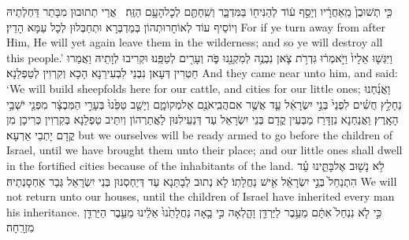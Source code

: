 {כִּ֤י תְשׁוּבֻן֙ מֵֽאַחֲרָ֔יו וְיָסַ֣ף ע֔וֹד לְהַנִּיח֖וֹ בַּמִּדְבָּ֑ר וְשִֽׁחַתֶּ֖ם לְכׇל\maqqaf הָעָ֥ם הַזֶּֽה׃ \setuma }
{אֲרֵי תְתוּבוּן מִבָּתַר דַּחְלְתֵיהּ וְיוֹסֵיף עוֹד לְאוֹחָרוּתְהוֹן בְּמַדְבְּרָא וּתְחַבְּלוּן לְכָל עַמָּא הָדֵין׃}
{For if ye turn away from after Him, He will yet again leave them in the wilderness; and so ye will destroy all this people.’}{}
{וַיִּגְּשׁ֤וּ אֵלָיו֙ וַיֹּ֣אמְר֔וּ גִּדְרֹ֥ת צֹ֛אן נִבְנֶ֥ה לְמִקְנֵ֖נוּ פֹּ֑ה וְעָרִ֖ים לְטַפֵּֽנוּ׃}
{וּקְרִיבוּ לְוָתֵיהּ וַאֲמַרוּ חַטְרִין דְּעָאן נִבְנֵי לִבְעִירַנָא הָכָא וְקִרְוִין לְטַפְלַנָא׃}
{And they came near unto him, and said: ‘We will build sheepfolds here for our cattle, and cities for our little ones;}{}
{וַאֲנַ֜חְנוּ נֵחָלֵ֣ץ חֻשִׁ֗ים לִפְנֵי֙ בְּנֵ֣י יִשְׂרָאֵ֔ל עַ֛ד אֲשֶׁ֥ר אִם\maqqaf הֲבִֽיאֹנֻ֖ם אֶל\maqqaf מְקוֹמָ֑ם וְיָשַׁ֤ב טַפֵּ֙נוּ֙ בְּעָרֵ֣י הַמִּבְצָ֔ר מִפְּנֵ֖י יֹשְׁבֵ֥י הָאָֽרֶץ׃}
{וַאֲנַחְנָא נִזְדָּרַז מַבְּעִין קֳדָם בְּנֵי יִשְׂרָאֵל עַד דְּנַעֵילִנּוּן לַאֲתַרְהוֹן וְיִתֵּיב טַפְלַנָא בְּקִרְוִין כְּרִיכָן מִן קֳדָם יָתְבֵי אַרְעָא׃}
{but we ourselves will be ready armed to go before the children of Israel, until we have brought them unto their place; and our little ones shall dwell in the fortified cities because of the inhabitants of the land.}{}
{לֹ֥א נָשׁ֖וּב אֶל\maqqaf בָּתֵּ֑ינוּ עַ֗ד הִתְנַחֵל֙ בְּנֵ֣י יִשְׂרָאֵ֔ל אִ֖ישׁ נַחֲלָתֽוֹ׃}
{לָא נְתוּב לְבָתַּנָא עַד דְּיַחְסְנוּן בְּנֵי יִשְׂרָאֵל גְּבַר אַחְסָנְתֵיהּ׃}
{We will not return unto our houses, until the children of Israel have inherited every man his inheritance.}{}
{כִּ֣י לֹ֤א נִנְחַל֙ אִתָּ֔ם מֵעֵ֥בֶר לַיַּרְדֵּ֖ן וָהָ֑לְאָה כִּ֣י בָ֤אָה נַחֲלָתֵ֙נוּ֙ אֵלֵ֔ינוּ מֵעֵ֥בֶר הַיַּרְדֵּ֖ן מִזְרָֽחָה׃ \petucha }

